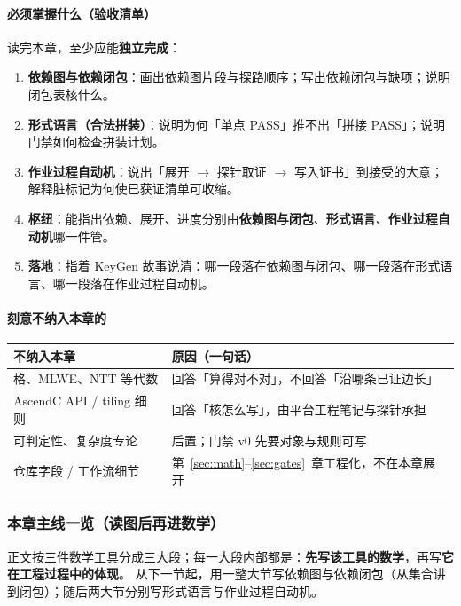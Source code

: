\documentclass[UTF8,a4paper,11pt]{ctexart}
\theoremstyle{definition}
\theoremstyle{plain}
\theoremstyle{remark}
\numberwithin{figure}{section}
\numberwithin{table}{section}
\begin{document}
\paragraph{必须掌握什么（验收清单）}
读完本章，至少应能\textbf{独立完成}：
\begin{enumerate}
  \item \textbf{依赖图与依赖闭包}：画出依赖图片段与探路顺序；写出依赖闭包与缺项；说明闭包表核什么。
  \item \textbf{形式语言（合法拼装）}：说明为何「单点 PASS」推不出「拼接 PASS」；说明门禁如何检查拼装计划。
  \item \textbf{作业过程自动机}：说出「展开 $\to$ 探针取证 $\to$ 写入证书」到接受的大意；解释脏标记为何使已获证清单可收缩。
  \item \textbf{枢纽}：能指出依赖、展开、进度分别由\textbf{依赖图与闭包}、\textbf{形式语言}、\textbf{作业过程自动机}哪一件管。
  \item \textbf{落地}：指着 KeyGen 故事说清：哪一段落在依赖图与闭包、哪一段落在形式语言、哪一段落在作业过程自动机。
\end{enumerate}

\paragraph{刻意不纳入本章的}
\begin{center}
\begin{tabular}{@{}L{4.2cm}L{9.0cm}@{}}
  \toprule
  不纳入本章 & 原因（一句话） \\
  \midrule
  格、MLWE、NTT 等代数 & 回答「算得对不对」，不回答「沿哪条已证边长」 \\
  AscendC API / tiling 细则 & 回答「核怎么写」，由平台工程笔记与探针承担 \\
  可判定性、复杂度专论 & 后置；门禁 v0 先要对象与规则可写 \\
  仓库字段 / 工作流细节 & 第~\ref{sec:math}--\ref{sec:gates}~章工程化，不在本章展开 \\
  \bottomrule
\end{tabular}
\end{center}

\subsubsection{本章主线一览（读图后再进数学）}
\label{sec:mathbg-spine}

正文按三件数学工具分成三大段；每一大段内部都是：\textbf{先写该工具的数学}，再写\textbf{它在工程过程中的体现}。
从下一节起，用一整大节写依赖图与依赖闭包（从集合讲到闭包）；随后两大节分别写形式语言与作业过程自动机。
\end{document}
